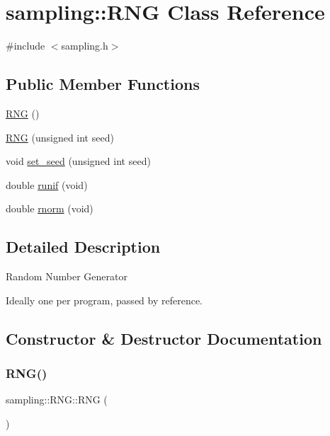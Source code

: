 \hypertarget{classsampling_1_1RNG}{}\section{sampling\+:\+:R\+NG Class Reference}
\label{classsampling_1_1RNG}


{\ttfamily \#include $<$sampling.\+h$>$}

\subsection*{Public Member Functions}
\begin{DoxyCompactItemize}
\item 
\hyperlink{classsampling_1_1RNG_ae61ad8991680f68b8c144a03a09a767a}{R\+NG} ()
\item 
\hyperlink{classsampling_1_1RNG_a2fa1a6176fc0fbc96a5c4a4ead6d7927}{R\+NG} (unsigned int seed)
\item 
void \hyperlink{classsampling_1_1RNG_ad739124235d7d9bbe31f86d37f2fb9e5}{set\+\_\+seed} (unsigned int seed)
\item 
double \hyperlink{classsampling_1_1RNG_aec538d8d9798abae38de908f69784421}{runif} (void)
\item 
double \hyperlink{classsampling_1_1RNG_af16b7ef97abf5c1e5cd03f301bbdb8b2}{rnorm} (void)
\end{DoxyCompactItemize}


\subsection{Detailed Description}
Random Number Generator

Ideally one per program, passed by reference. 

\subsection{Constructor \& Destructor Documentation}
\mbox{\label{classsampling_1_1RNG_ae61ad8991680f68b8c144a03a09a767a}} 
\subsubsection{\texorpdfstring{R\+N\+G()}{RNG()}\hspace{0.1cm}{\footnotesize\ttfamily [1/2]}}
{\footnotesize\ttfamily sampling\+::\+R\+N\+G\+::\+R\+NG (\begin{DoxyParamCaption}{ }\end{DoxyParamCaption})}

